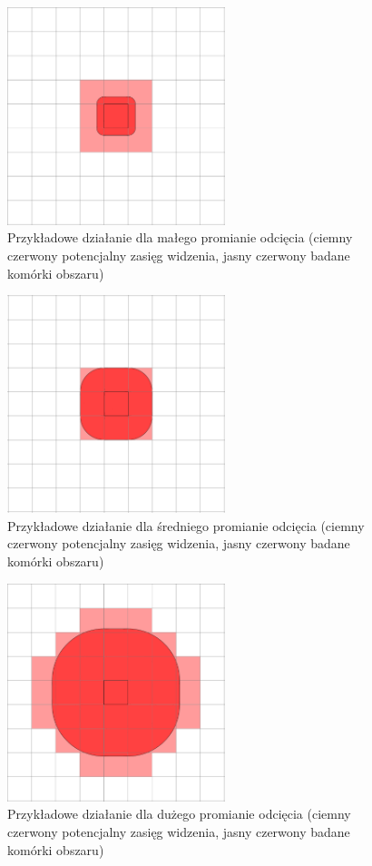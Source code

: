 \documentclass{article}
\begin{document}
\begin{figure}
    \centering
    \includegraphics[width=2.5in]{0,3.png}
    \caption{Przykładowe działanie dla małego promianie odcięcia (ciemny czerwony potencjalny zasięg widzenia, jasny czerwony badane komórki obszaru)}
    \label{rys:ex_1}
\end{figure}

\begin{figure}
    \centering
    \includegraphics[width=2.5in]{1.png}
    \caption{Przykładowe działanie dla średniego promianie odcięcia (ciemny czerwony potencjalny zasięg widzenia, jasny czerwony badane komórki obszaru)}
    \label{rys:ex_2}
\end{figure}

\begin{figure}
    \centering
    \includegraphics[width=2.5in]{2,15.png}
    \caption{Przykładowe działanie dla dużego promianie odcięcia (ciemny czerwony potencjalny zasięg widzenia, jasny czerwony badane komórki obszaru)}
    \label{rys:ex_3}
\end{figure}
\end{document}
